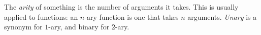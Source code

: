 \documentclass[12pt]{article}
\begin{document}
The \emph{arity} of something is the number of arguments it takes.  This is usually applied to functions: an $n$-ary function is one that takes $n$ arguments.  \emph{Unary} is a synonym for $1$-ary, and binary for $2$-ary.
\end{document}
